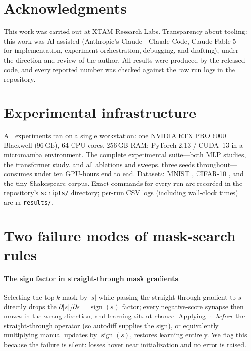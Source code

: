 \documentclass[11pt]{article}
\begin{document}







\section*{Acknowledgments}
This work was carried out at XTAM Research Labs. Transparency about tooling:
this work was AI-assisted (Anthropic's Claude---Claude Code, Claude Fable
5---for implementation, experiment orchestration, debugging, and drafting),
under the direction and review of the author. All results were produced by
the released code, and every reported number was checked against the raw run
logs in the repository.




\appendix







\section{Experimental infrastructure}
\label{app:infra}
All experiments ran on a single workstation: one NVIDIA RTX PRO 6000
Blackwell (96\,GB), 64 CPU cores, 256\,GB RAM; PyTorch 2.13 / CUDA~13 in a
micromamba environment. The complete experimental suite---both MLP studies,
the transformer study, and all ablations and sweeps, three seeds
throughout---consumes under ten GPU-hours end to end. Datasets: MNIST
\citep{lecun1998gradient}, CIFAR-10 \citep{krizhevsky2009learning}, and the
tiny Shakespeare corpus. Exact commands for every run are recorded in the
repository's \texttt{scripts/} directory; per-run CSV logs (including
wall-clock times) are in \texttt{results/}.

\section{Two failure modes of mask-search rules}
\label{app:failures}

\paragraph{The sign factor in straight-through mask gradients.} Selecting the
top-$k$ mask by $|s|$ while passing the straight-through gradient to $s$
directly drops the $\partial|s|/\partial s = \operatorname{sign}(s)$ factor;
every negative-score synapse then moves in the wrong direction, and learning
sits at chance. Applying $|\cdot|$ \emph{before} the straight-through
operator (so autodiff supplies the sign), or equivalently multiplying manual
updates by $\operatorname{sign}(s)$, restores learning entirely. We flag this
because the failure is silent: losses hover near initialization and no error
is raised.
\end{document}
